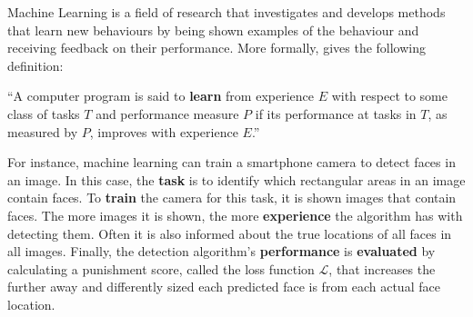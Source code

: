 Machine Learning is a field of research that investigates and develops methods that learn new behaviours by being shown examples of the behaviour and receiving feedback on their performance. More formally, \textcite{machine-learning-1997} gives the following definition:
\begin{center}
    ``A computer program is said to \textbf{learn} from experience $E$ with respect to some class of tasks $T$ and performance measure $P$ if its performance at tasks in $T$, as measured by $P$, improves with experience $E$.''
\end{center}
For instance, machine learning can train a smartphone camera to detect faces in an image. In this case, the \textbf{task} is to identify which rectangular areas in an image contain faces. To \textbf{train} the camera for this task, it is shown images that contain faces. The more images it is shown, the more \textbf{experience} the algorithm has with detecting them. Often it is also informed about the true locations of all faces in all images. Finally, the detection algorithm's \textbf{performance} is \textbf{evaluated} by calculating a punishment score, called the loss function $\mathcal{L}$, that increases the further away and differently sized each predicted face is from each actual face location.

